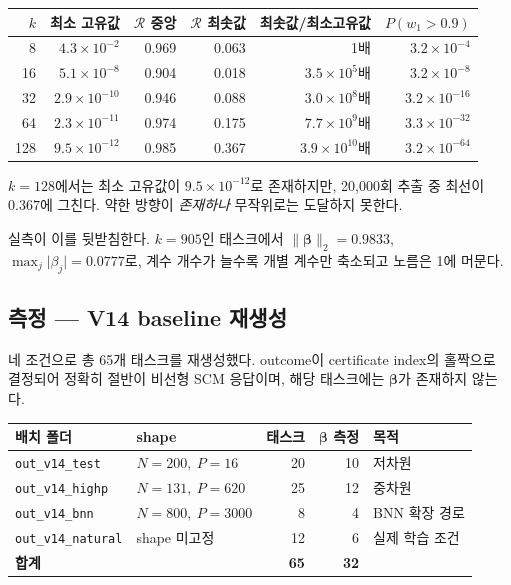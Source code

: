 \documentclass[11pt,a4paper]{article}
\theoremstyle{definition}
\newcommand{\R}{\mathcal{R}}
\newcommand{\bbeta}{\boldsymbol{\beta}}
\begin{document}
\begin{center}
\small
\begin{tabular}{@{}rrrrrr@{}}
\toprule
\(k\) & 최소 고유값 & \(\R\) 중앙 & \(\R\) 최솟값 & 최솟값/최소고유값 & \(P(w_1>0.9)\)\\
\midrule
8 & \(4.3\times10^{-2}\) & 0.969 & 0.063 & 1배 & \(3.2\times10^{-4}\)\\
16 & \(5.1\times10^{-8}\) & 0.904 & 0.018 & \(3.5\times10^{5}\)배 & \(3.2\times10^{-8}\)\\
32 & \(2.9\times10^{-10}\) & 0.946 & 0.088 & \(3.0\times10^{8}\)배 & \(3.2\times10^{-16}\)\\
64 & \(2.3\times10^{-11}\) & 0.974 & 0.175 & \(7.7\times10^{9}\)배 & \(3.3\times10^{-32}\)\\
128 & \(9.5\times10^{-12}\) & 0.985 & 0.367 & \(3.9\times10^{10}\)배 & \(3.2\times10^{-64}\)\\
\bottomrule
\end{tabular}
\end{center}

\(k=128\)에서는 최소 고유값이 \(9.5\times10^{-12}\)로 존재하지만, 20{,}000회 추출 중 최선이 \(0.367\)에 그친다. 약한 방향이 \emph{존재하나} 무작위로는 도달하지 못한다.

실측이 이를 뒷받침한다. \(k=905\)인 태스크에서 \(\lVert\bbeta\rVert_2=0.9833\), \(\max_j\lvert\beta_j\rvert=0.0777\)로, 계수 개수가 늘수록 개별 계수만 축소되고 노름은 1에 머문다.

\subsection{측정 --- V14 baseline 재생성}

네 조건으로 총 65개 태스크를 재생성했다. outcome이 certificate index의 홀짝으로 결정되어 정확히 절반이 비선형 SCM 응답이며, 해당 태스크에는 \(\bbeta\)가 존재하지 않는다.

\begin{center}
\small
\begin{tabular}{@{}llrrl@{}}
\toprule
\textbf{배치 폴더} & \textbf{shape} & \textbf{태스크} & \textbf{\(\bbeta\) 측정} & \textbf{목적}\\
\midrule
\verb|out_v14_test| & \(N{=}200,\ P{=}16\) & 20 & 10 & 저차원\\
\verb|out_v14_highp| & \(N{=}131,\ P{=}620\) & 25 & 12 & 중차원\\
\verb|out_v14_bnn| & \(N{=}800,\ P{=}3000\) & 8 & 4 & BNN 확장 경로\\
\verb|out_v14_natural| & shape 미고정 & 12 & 6 & 실제 학습 조건\\
\midrule
\textbf{합계} & & \textbf{65} & \textbf{32} & \\
\bottomrule
\end{tabular}
\end{center}
\end{document}
